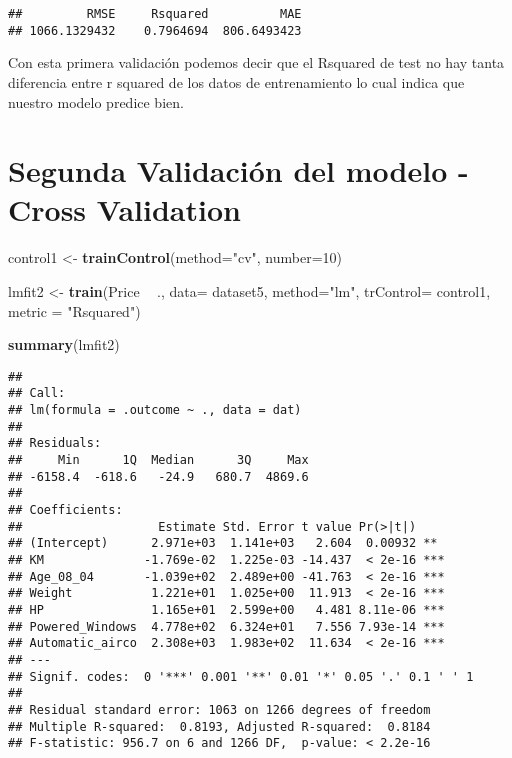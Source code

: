 \documentclass[
]{article}
\newenvironment{Shaded}{\begin{snugshade}}{\end{snugshade}}
\newcommand{\DataTypeTok}[1]{\textcolor[rgb]{0.13,0.29,0.53}{#1}}
\newcommand{\DecValTok}[1]{\textcolor[rgb]{0.00,0.00,0.81}{#1}}
\newcommand{\KeywordTok}[1]{\textcolor[rgb]{0.13,0.29,0.53}{\textbf{#1}}}
\newcommand{\NormalTok}[1]{#1}
\newcommand{\OperatorTok}[1]{\textcolor[rgb]{0.81,0.36,0.00}{\textbf{#1}}}
\newcommand{\StringTok}[1]{\textcolor[rgb]{0.31,0.60,0.02}{#1}}
\begin{document}
\begin{verbatim}
##         RMSE     Rsquared          MAE 
## 1066.1329432    0.7964694  806.6493423
\end{verbatim}

Con esta primera validación podemos decir que el Rsquared de test no hay
tanta diferencia entre r squared de los datos de entrenamiento lo cual
indica que nuestro modelo predice bien.

\hypertarget{segunda-validaciuxf3n-del-modelo---cross-validation}{%
\section{Segunda Validación del modelo - Cross
Validation}\label{segunda-validaciuxf3n-del-modelo---cross-validation}}

\begin{Shaded}
\begin{Highlighting}[]
\NormalTok{control1 <-}\StringTok{ }\KeywordTok{trainControl}\NormalTok{(}\DataTypeTok{method=}\StringTok{"cv"}\NormalTok{, }\DataTypeTok{number=}\DecValTok{10}\NormalTok{)}

\NormalTok{lmfit2 <-}\StringTok{ }\KeywordTok{train}\NormalTok{(Price }\OperatorTok{~}\StringTok{ }\NormalTok{., }\DataTypeTok{data=}\NormalTok{ dataset5, }\DataTypeTok{method=}\StringTok{"lm"}\NormalTok{, }\DataTypeTok{trControl=}\NormalTok{ control1, }\DataTypeTok{metric =} \StringTok{"Rsquared"}\NormalTok{)}

\KeywordTok{summary}\NormalTok{(lmfit2)}
\end{Highlighting}
\end{Shaded}

\begin{verbatim}
## 
## Call:
## lm(formula = .outcome ~ ., data = dat)
## 
## Residuals:
##     Min      1Q  Median      3Q     Max 
## -6158.4  -618.6   -24.9   680.7  4869.6 
## 
## Coefficients:
##                   Estimate Std. Error t value Pr(>|t|)    
## (Intercept)      2.971e+03  1.141e+03   2.604  0.00932 ** 
## KM              -1.769e-02  1.225e-03 -14.437  < 2e-16 ***
## Age_08_04       -1.039e+02  2.489e+00 -41.763  < 2e-16 ***
## Weight           1.221e+01  1.025e+00  11.913  < 2e-16 ***
## HP               1.165e+01  2.599e+00   4.481 8.11e-06 ***
## Powered_Windows  4.778e+02  6.324e+01   7.556 7.93e-14 ***
## Automatic_airco  2.308e+03  1.983e+02  11.634  < 2e-16 ***
## ---
## Signif. codes:  0 '***' 0.001 '**' 0.01 '*' 0.05 '.' 0.1 ' ' 1
## 
## Residual standard error: 1063 on 1266 degrees of freedom
## Multiple R-squared:  0.8193, Adjusted R-squared:  0.8184 
## F-statistic: 956.7 on 6 and 1266 DF,  p-value: < 2.2e-16
\end{verbatim}
\end{document}
